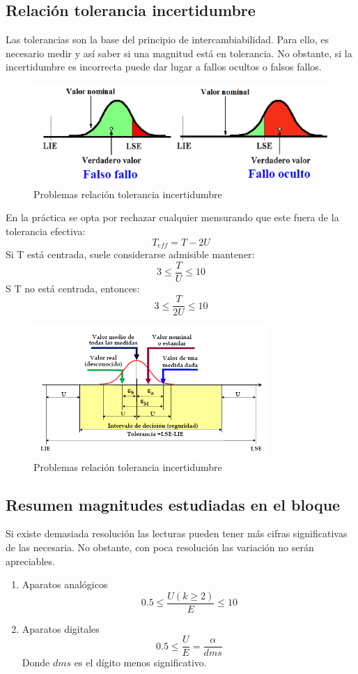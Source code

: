 \subsection{Relación tolerancia incertidumbre}
Las tolerancias son la base del principio de intercambiabilidad. Para ello, es necesario medir y así saber si una magnitud está en tolerancia. No obstante, si la incertidumbre es incorrecta puede dar lugar a fallos ocultos o falsos fallos.
 \begin{figure} [H]
 	\centering
 	\includegraphics[width=1\textwidth]{imagenesTema1/tolerancia.png}  
 	\caption{Problemas relación tolerancia incertidumbre}
 	\label{fig:sample}
 	\end{figure}
 	
En la práctica se opta por rechazar cualquier mensurando que este fuera de la tolerancia efectiva:
 \[T_{eff}=T-2U\]
 Si T está centrada, suele considerarse admisible mantener:
 \[3\leq \frac{T}{U} \leq 10\]
 S T no está centrada, entonces:
  \[3\leq \frac{T}{2U} \leq 10\]
 
 \begin{figure} [H]
 	\centering
 	\includegraphics[width=0.8\textwidth]{imagenesTema1/resumen.png}  
 	\caption{Problemas relación tolerancia incertidumbre}
 	\label{fig:sample}
 \end{figure}
 	
\subsection{Resumen magnitudes estudiadas en el bloque}
Si existe demasiada resolución las lecturas pueden tener más cifras significativas de las necesaria. No obstante, con poca resolución las variación no serán apreciables.
\begin{enumerate}
	\item Aparatos analógicos
	\[0.5\leq \frac{U(k \geq 2)}{E} \leq 10\]
	\item Aparatos digitales
		\[0.5\leq \frac{U}{E} = \frac{\alpha}{dms}\]
		Donde $dms$ es el dígito menos significativo.
\end{enumerate}
